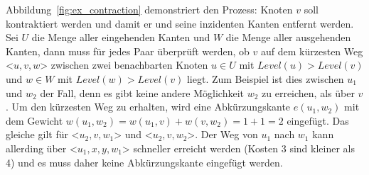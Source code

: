 Abbildung~\ref{fig:ex_contraction} demonstriert den Prozess: Knoten $v$ soll kontraktiert werden und
damit er und seine inzidenten Kanten entfernt werden. Sei $U$ die Menge aller eingehenden Kanten und
$W$ die Menge aller ausgehenden Kanten, dann muss für jedes Paar überprüft werden, ob $v$ auf dem
kürzesten Weg <$u,v,w$> zwischen zwei benachbarten Knoten $u \in U$ mit $Level(u) > Level(v)$ und $w
    \in W$ mit $Level(w) > Level(v)$ liegt. Zum Beispiel ist dies zwischen $u_1$ und $w_2$ der Fall,
denn es gibt keine andere Möglichkeit $w_2$ zu erreichen, als über $v$. Um den kürzesten Weg zu
erhalten, wird eine Abkürzungskante $e(u_1,w_2)$ mit dem Gewicht
$w(u_1,w_2)=w(u_1,v)+w(v,w_2)=1+1=2$ eingefügt. Das gleiche gilt für <$u_2,v,w_1$> und
<$u_2,v,w_2$>. Der Weg von $u_1$ nach $w_1$ kann allerding über <$u_1,x,y,w_1$> schneller erreicht
werden (Kosten 3 sind kleiner als 4) und es muss daher keine Abkürzungskante eingefügt werden.
